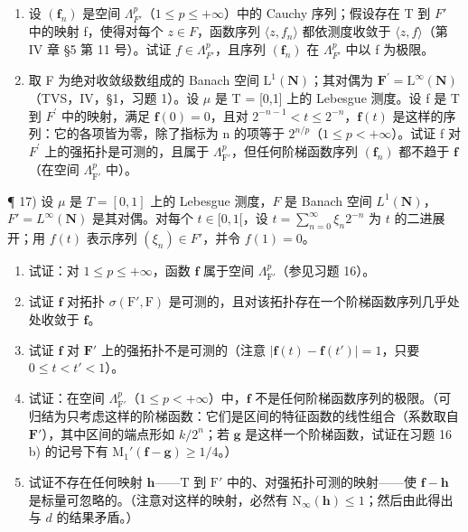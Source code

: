 \begin{enumerate}
\def\labelenumi{\alph{enumi})}
\setcounter{enumi}{5}
\item
  设 \((\mathbf{f}_{n})\) 是空间 \(\Lambda_{F'}^{p}\)（\(1 \leqslant p \leqslant +\infty\)）中的 Cauchy 序列；假设存在 T 到 \(F'\) 中的映射 f，使得对每个 \(z \in F\)，函数序列 \(\langle z, f_{n} \rangle\) 都依测度收敛于 \(\langle z, f \rangle\)（第 IV 章 §5 第 11 号）。试证 \(f \in \Lambda_{F'}^{p}\)，且序列 \((\mathbf{f}_{n})\) 在 \(\Lambda_{F'}^{p}\) 中以 f 为极限。
\item
  取 F 为绝对收敛级数组成的 Banach 空间 \(\mathrm{L}^{1}(\mathbf{N})\)；其对偶为 \(\mathbf{F}^{\prime} = \mathrm{L}^{\infty}(\mathbf{N})\)（TVS，IV，§1，习题 1）。设 \(\mu\) 是 T = {[}0,1{]} 上的 Lebesgue 测度。设 f 是 T 到 \(F^{\prime}\) 中的映射，满足 \(\mathbf{f}(0) = 0\)，且对 \(2^{-n-1} < t \leqslant 2^{-n}\)，\(\mathbf{f}(t)\) 是这样的序列：它的各项皆为零，除了指标为 n 的项等于 \(2^{n/p}\)（\(1 \leqslant p < +\infty\)）。试证 f 对 \(F^{\prime}\) 上的强拓扑是可测的，且属于 \(\Lambda_{\mathrm{F}'}^p\)，但任何阶梯函数序列 \((\mathbf{f}_n)\) 都不趋于 \(\mathbf{f}\)（在空间 \(\Lambda_{\mathrm{F}'}^p\) 中）。
\end{enumerate}

¶ 17) 设 \(\mu\) 是 \(T = [0,1]\) 上的 Lebesgue 测度，\(F\) 是 Banach 空间 \(L^1(\mathbf{N})\)，\(F' = L^\infty(\mathbf{N})\) 是其对偶。对每个 \(t \in [0,1[\)，设 \(t = \sum_{n=0}^\infty \xi_n 2^{-n}\) 为 \(t\) 的二进展开；用 \(f(t)\) 表示序列 \((\xi_n) \in F'\)，并令 \(f(1) = 0\)。

\begin{enumerate}
\def\labelenumi{\alph{enumi})}
\item
  试证：对 \(1 \leqslant p \leqslant +\infty\)，函数 \(\mathbf{f}\) 属于空间 \(\Lambda_{\mathrm{F}'}^p\)（参见习题 16）。
\item
  试证 \(\mathbf{f}\) 对拓扑 \(\sigma(\mathrm{F}',\mathrm{F})\) 是可测的，且对该拓扑存在一个阶梯函数序列几乎处处收敛于 \(\mathbf{f}\)。
\item
  试证 \(\mathbf{f}\) 对 \(\mathbf{F}'\) 上的强拓扑不是可测的（注意 \(|\mathbf{f}(t) - \mathbf{f}(t')| = 1\)，只要 \(0 \leqslant t < t' < 1\)）。
\item
  试证：在空间 \(\Lambda_{\mathrm{F}'}^p\)（\(1 \leqslant p < +\infty\)）中，\(\mathbf{f}\) 不是任何阶梯函数序列的极限。（可归结为只考虑这样的阶梯函数：它们是区间的特征函数的线性组合（系数取自 \(\mathbf{F}'\)），其中区间的端点形如 \(k/2^n\)；若 \(\mathbf{g}\) 是这样一个阶梯函数，试证在习题 16 b) 的记号下有 \(\mathrm{M}_1'(\mathbf{f} - \mathbf{g}) \geqslant 1/4\)。）
\item
  试证不存在任何映射 \(\mathbf{h}\)——\(\mathrm{T}\) 到 \(\mathrm{F}'\) 中的、对强拓扑可测的映射——使 \(\mathbf{f} - \mathbf{h}\) 是标量可忽略的。（注意对这样的映射，必然有 \(\mathrm{N}_{\infty}(\mathbf{h}) \leqslant 1\)；然后由此得出与 \(d\) 的结果矛盾。）
\end{enumerate}

